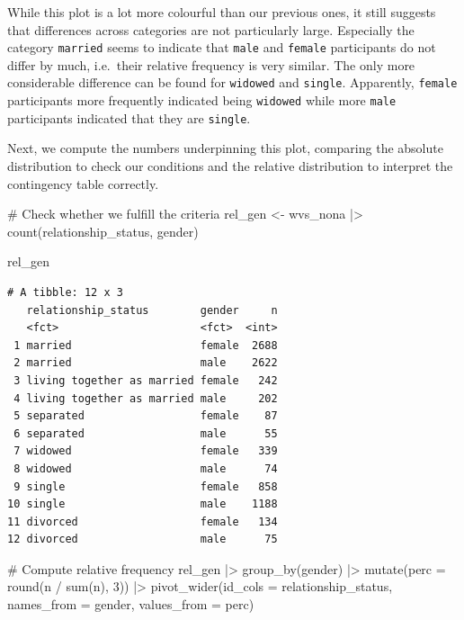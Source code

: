 \documentclass[
  letterpaper,
]{krantz}
\makeatletter
\newenvironment{Shaded}{\begin{snugshade}}{\end{snugshade}}
\newcommand{\AttributeTok}[1]{\textcolor[rgb]{0.40,0.45,0.13}{#1}}
\newcommand{\CommentTok}[1]{\textcolor[rgb]{0.37,0.37,0.37}{#1}}
\newcommand{\DecValTok}[1]{\textcolor[rgb]{0.68,0.00,0.00}{#1}}
\newcommand{\FunctionTok}[1]{\textcolor[rgb]{0.28,0.35,0.67}{#1}}
\newcommand{\NormalTok}[1]{\textcolor[rgb]{0.00,0.23,0.31}{#1}}
\newcommand{\OtherTok}[1]{\textcolor[rgb]{0.00,0.23,0.31}{#1}}
\newcommand{\SpecialCharTok}[1]{\textcolor[rgb]{0.37,0.37,0.37}{#1}}
\newenvironment{kframe}{%
\medskip{}
\setlength{\fboxsep}{.8em}
 \def\at@end@of@kframe{}%
 \ifinner\ifhmode%
  \def\at@end@of@kframe{\end{minipage}}%
  \begin{minipage}{\columnwidth}%
 \fi\fi%
 \def\FrameCommand##1{\hskip\@totalleftmargin \hskip-\fboxsep
 \colorbox{shadecolor}{##1}\hskip-\fboxsep
     \hskip-\linewidth \hskip-\@totalleftmargin \hskip\columnwidth}%
 \MakeFramed {\advance\hsize-\width
   \@totalleftmargin\z@ \linewidth\hsize
   \@setminipage}}%
 {\par\unskip\endMakeFramed%
 \at@end@of@kframe}
\renewenvironment{Shaded}{\begin{kframe}}{\end{kframe}}
\makeatother
\begin{document}
While this plot is a lot more colourful than our previous ones, it still
suggests that differences across categories are not particularly large.
Especially the category \texttt{married} seems to indicate that
\texttt{male} and \texttt{female} participants do not differ by much,
i.e.~their relative frequency is very similar. The only more
considerable difference can be found for \texttt{widowed} and
\texttt{single}. Apparently, \texttt{female} participants more
frequently indicated being \texttt{widowed} while more \texttt{male}
participants indicated that they are \texttt{single}.

Next, we compute the numbers underpinning this plot, comparing the
absolute distribution to check our conditions and the relative
distribution to interpret the contingency table correctly.

\begin{Shaded}
\begin{Highlighting}[]
\CommentTok{\# Check whether we fulfill the criteria}
\NormalTok{rel\_gen }\OtherTok{\textless{}{-}}
\NormalTok{  wvs\_nona }\SpecialCharTok{|\textgreater{}}
  \FunctionTok{count}\NormalTok{(relationship\_status, gender)}

\NormalTok{rel\_gen}
\end{Highlighting}
\end{Shaded}

\begin{verbatim}
# A tibble: 12 x 3
   relationship_status        gender     n
   <fct>                      <fct>  <int>
 1 married                    female  2688
 2 married                    male    2622
 3 living together as married female   242
 4 living together as married male     202
 5 separated                  female    87
 6 separated                  male      55
 7 widowed                    female   339
 8 widowed                    male      74
 9 single                     female   858
10 single                     male    1188
11 divorced                   female   134
12 divorced                   male      75
\end{verbatim}

\begin{Shaded}
\begin{Highlighting}[]
\CommentTok{\# Compute relative frequency}
\NormalTok{rel\_gen }\SpecialCharTok{|\textgreater{}}
  \FunctionTok{group\_by}\NormalTok{(gender) }\SpecialCharTok{|\textgreater{}}
  \FunctionTok{mutate}\NormalTok{(}\AttributeTok{perc =} \FunctionTok{round}\NormalTok{(n }\SpecialCharTok{/} \FunctionTok{sum}\NormalTok{(n), }\DecValTok{3}\NormalTok{)) }\SpecialCharTok{|\textgreater{}}
  \FunctionTok{pivot\_wider}\NormalTok{(}\AttributeTok{id\_cols =}\NormalTok{ relationship\_status,}
              \AttributeTok{names\_from =}\NormalTok{ gender,}
              \AttributeTok{values\_from =}\NormalTok{ perc)}
\end{Highlighting}
\end{Shaded}
\end{document}

